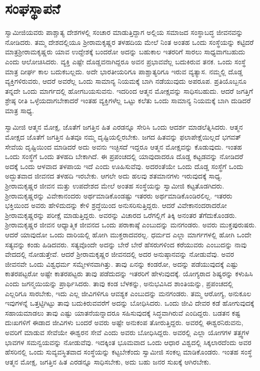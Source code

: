 
\chapter{ಸಂಘಸ್ಥಾಪನೆ}

 ಸ್ವಾಮೀಜಿಯವರು ಪಾಶ್ಚಾತ್ಯ ದೇಶಗಳಲ್ಲಿ ಸಂಚಾರ ಮಾಡುತ್ತಿದ್ದಾಗ ಅಲ್ಲಿಯ ಸಮಾಜದ ಸಂಸ್ಥಾಬದ್ಧ ಜೀವನವನ್ನು ನೋಡಿದರು. ತಮ್ಮ ದೇಶದಲ್ಲಿಯೂ ಶ‍್ರೀರಾಮಕೃಷ್ಣರ ತಳಹದಿಯ ಮೇಲೆ ನಿಂತ ಅಂತಹ ಒಂದು ಸಂಸ್ಥೆಯನ್ನು ಕಟ್ಟಿದರೆ ಮಾತ್ರ\break ಶ‍್ರೀರಾಮಕೃಷ್ಣರು ಯಾವ ಉದ್ದೇಶಕ್ಕೆ ಬಂದರೋ ಅದನ್ನು ಬಹುಕಾಲ ಇತರರಿಗೆ ಸಾರಲು ಸಾಧ್ಯವಾಗಬಹುದು ಎಂದು ಆಲೋಚಿಸಿದರು. ವ್ಯಕ್ತಿ ಎಷ್ಟೇ ದೊಡ್ಡವನಾಗಿದ್ದರೂ ಅವನ ಪ್ರಭಾವವೆಲ್ಲ ಬದುಕಿರುವ ತನಕ. ಒಂದು ಸಂಸ್ಥೆ ಮಾತ್ರ ದೀರ್ಘ ಕಾಲ ಬದುಕಬಲ್ಲದು. ಅದೇ ಭಾರತೀಯರಿಗೂ‌ ಪಾಶ್ಚಾತ್ಯರಿಗೂ ಇರುವ ವ್ಯತ್ಯಾಸ. ನಮ್ಮಲ್ಲಿ ದೊಡ್ಡ ವ್ಯಕ್ತಿಗಳಿರುವರು, ಆದರೆ ಅವರೆಲ್ಲ ಒಂದು ಸಾಮಾನ್ಯ ನಿಯಮಕ್ಕೆ ಬಾಗಿ ನಡೆಯುವುದು ಅಪರೂಪ. ಪ್ರತಿಯೊಬ್ಬನೂ ತನ್ನದೇ ಒಂದು ಮಾರ್ಗದಲ್ಲಿ ಹೋಗಬಯಸುವನು. ಇದರಿಂದ ಆತ್ಮನ ಮೋಕ್ಷವನ್ನು ಸಾಧಿಸಬಹುದು. ಆದರೆ ಜಗತ್ತಿಗೆ ಶ್ರೇಷ್ಠ ರೀತಿ ಒಳ್ಳೆಯದಾಗಬೇಕಾದರೆ ಇಂತಹ ವ್ಯಕ್ತಿಗಳೆಲ್ಲ ಒಟ್ಟು ಕಲೆತು ಒಂದು ಸಾಮಾನ್ಯ ನಿಯಮಕ್ಕೆ ಬಾಗಿ ದುಡಿದರೆ ಮಾತ್ರ ಸಾಧ್ಯ. 

 ಸ್ವಾಮೀಜಿ ಆತ್ಮನ ಮೋಕ್ಷ, ಜೊತೆಗೆ ಜಗತ್ತಿನ ಹಿತ ಎರಡನ್ನೂ ಸೇರಿಸಿ ಒಂದು ಆದರ್ಶ ಮಾಡಲೆತ್ನಿಸಿದರು. ಆತ್ಮನ ಮೋಕ್ಷದ ಜೊತೆಗೆ ಜಗತ್ತಿನ ಹಿತವೂ ನಮ್ಮ ದೃಷ್ಟಿಯಲ್ಲಿರಬೇಕು. ಜಗದ ಹಿತವನ್ನು ಫಲಾಪೇಕ್ಷೆಯಿಲ್ಲದೆ ಭಗವತ್ ಸೇವೆಯ ದೃಷ್ಟಿಯಿಂದ ಮಾಡಿದರೆ ಅದು ಅವನು ಇಚ್ಛಿಸದೆ ಇದ್ದರೂ ಆತ್ಮನ ಮೋಕ್ಷವನ್ನು ಕೊಡುವುದು. ಇಂತಹ ಒಂದು ಸಂಸ್ಥೆಗೆ ಒಂದು ತಳಹದಿ ಬೇಕಾಗಿದೆ. ಈ ಪ್ರಪಂಚದಲ್ಲಿ ಯಾವುದಾದರೂ ದೊಡ್ಡ ಕಟ್ಟಡವನ್ನು ನೋಡಿದರೆ ಅದಕ್ಕೆ ಒಂದು ಆಳವಾದ ತಳಪಾಯ ಇದೆ ಎಂದು ಊಹಿಸುವೆವು. ಅದರಂತೆಯೇ ಒಂದು ದೊಡ್ಡ ಸಂಸ್ಥೆಗೆ ಒಂದು ಅದ್ಭುತವಾದ ಜೀವನದ ತಳಹದಿ ಇರಬೇಕು. ಆಗಲೇ ಅದು ಹಲವು ಶತಮಾನಗಳು ಇರುವುದಕ್ಕೆ ಸಾಧ್ಯ. ಶ‍್ರೀರಾಮಕೃಷ್ಣರ ಜೀವನ ಮತ್ತು ಉಪದೇಶದ ಮೇಲೆ ಅಂತಹ ಸಂಸ್ಥೆಯನ್ನು ಸ್ವಾಮೀಜಿ ಕಟ್ಟತೊಡಗಿದರು. ಶ‍್ರೀರಾಮಕೃಷ್ಣರನ್ನು ವಿವೇಕಾನಂದರು ಅರ್ಥಮಾಡಿಕೊಂಡಷ್ಟು ಇತರರು ಅರ್ಥಮಾಡಿಕೊಂಡಿರಲಿಲ್ಲ. ಇತರರು ಭಕ್ತಿಯಿಂದ ಅವರು ಹೇಳಿದುದನ್ನು ಕೇಳಿ ಶ್ರದ್ಧೆಯಿಂದ ಅನುಸರಿಸುತ್ತಿದ್ದರು. ಆದರೆ ವಿವೇಕಾನಂದರಾದರೋ ಶ‍್ರೀರಾಮಕೃಷ್ಣರನ್ನು ಪರೀಕ್ಷೆ ಮಾಡುತ್ತಿದ್ದರು. ಅವರನ್ನು ವಿಚಾರದ ಒರೆಗಲ್ಲಿಗೆ ತಿಕ್ಕಿ ಅನಂತರ ತೆಗೆದುಕೊಂಡರು. ಶ‍್ರೀರಾಮಕೃಷ್ಣರ ಜೀವನ ಆಧ್ಯಾತ್ಮಿಕ ಜೀವನದ ಒಂದು ಪರಾಕಾಷ್ಠೆ ಎಂಬುದನ್ನು ಮನಗಂಡರು. ಅವರು ಮುಕ್ತಪುರುಷರು. ಆದರೆ ಯಾವುದೋ ಒಂದು ದಾರಿಯಲ್ಲಿ ಹೋಗಿ ಮುಕ್ತರಾದವರಲ್ಲ. ಧರ್ಮದ ಎಲ್ಲಾ ಮಾರ್ಗಗಳಲ್ಲಿ ಹೋಗಿ ಒಂದೇ ಸತ್ಯವನ್ನು ಕಂಡು ಹಿಡಿದವರು. ಸತ್ಯವೊಂದೇ ಅದನ್ನು ಬೇರೆ ಬೇರೆ ಹೆಸರುಗಳಿಂದ ಕರೆಯುವರು ಎಂಬುದನ್ನು ನಾವು ವೇದದಲ್ಲಿ ನೋಡುತ್ತೇವೆ. ಆದರೆ ಶ‍್ರೀರಾಮಕೃಷ್ಣರ ಜೀವನದಲ್ಲಿ ಅದರ ಅನುಷ್ಠಾನವನ್ನು ನೋಡುವೆವು. ಅವರ ಜೀವನವೇ ಒಂದು ವಿಶ್ವಧರ್ಮ ಸಮ್ಮೇಳನವಾಗಿತ್ತು. ತಾವು ಏನನ್ನು ಕಂಡರೋ, ಅದನ್ನು ಪಡೆಯುವುದಕ್ಕೆ ಎಷ್ಟು ಕಾತರಪಟ್ಟರೋ ಅಷ್ಟೇ ಕಾತರಪಟ್ಟರು ತಾವು ಪಡೆದುದನ್ನು ಇತರರಿಗೆ ಹೇಳುವುದಕ್ಕೆ. ಯೋಗ್ಯರಾದ ಶಿಷ್ಯರನ್ನು ಕಳುಹಿಸಿ ಎಂದು ಜಗನ್ಮಯಿಯನ್ನು ಪ್ರಾರ್ಥಿಸಿದರು. ತಾವು ಕಂಡ ಬೆಳಕನ್ನು, ಅನುಭವಿಸಿದ ಶಾಂತಿಯನ್ನು, ಪ್ರಪಂಚದಲ್ಲಿ ಎಲ್ಲರಿಗೂ ಸಾರಬೇಕು, ಇದು ಎಲ್ಲ ಜೀವಿಗಳಿಗೂ ಆವಶ್ಯಕ ಎಂಬುದನ್ನು ಮನಗಂಡರು. ತಮ್ಮ ಆರೋಗ್ಯ, ಅನುಕೂಲ ಇವುಗಳನ್ನೆ ಒತ್ತಟ್ಟಿಗಿಟ್ಟು ತಾವು ಬದುಕಿರುವವರೆಗೆ ಅದನ್ನು ಬೋಧಿಸಿದರು. ಒಂದು ಜೀವಿ ದೇವರ ಕಡೆ ಹೋಗುವುದಕ್ಕೆ ಸಹಾಯಮಾಡಲು ತಾವು ಎಷ್ಟು ಯಾತನೆಯನ್ನಾದರೂ ಸಹಿಸುವುದಕ್ಕೆ ಸಿದ್ಧವಾಗಿರುವೆ ಎಂದಿದ್ದರು. ಬಡತನ ಕಷ್ಟ ದುಃಖಗಳಿಗೆ ಈಡಾದ ಜೀವಿಗಳು ಬಂದರೆ ಅವರು ಅಷ್ಟೇ ಅನುಕಂಪ ತೋರುತ್ತಿದ್ದರು. ಅವರಲ್ಲಿ ಈಶ್ವರನಿರುವನು, ಅವರಿಗೆ ಮಾಡುವ ಸೇವೆಯೇ ಈಶ್ವರನ ಸೇವೆ ಎಂದು ಅವರು ಬೋಧಿಸಿದ್ದರು. ಅವರಲ್ಲಿ ಎಲ್ಲಾ ಯೋಗಗಳ ತತ್ತ್ವಗಳ ಭಾವಗಳ ಸಮನ್ವಯವನ್ನು ನೋಡುವೆವು. ಇದಕ್ಕಿಂತ ಭೂಮವಾದ ಒಂದು ಆಧಾರ ವಿಶ್ವದಲ್ಲಿ ಸಿಕ್ಕಲಾರದೆಂದು ಅವರ ಹೆಸರಿನಲ್ಲಿ ಒಂದು ಸುವ್ಯವಸ್ಥಿತವಾದ ಸಂಸ್ಥೆಯನ್ನು ಕಟ್ಟಬೇಕೆಂದು ಸ್ವಾಮೀಜಿ ಸಂಕಲ್ಪ ಮಾಡಿಕೊಂಡರು. ಇಂತಹ ಸಂಸ್ಥೆ ಆತ್ಮನ ಮೋಕ್ಷ, ಜಗತ್ತಿನ ಹಿತ ಎರಡನ್ನೂ ಸಾಧಿಸಬೇಕು, ಅದು ಬಹು ಜನರ ಸುಖಕ್ಕೆ ಆಗಿರಬೇಕು. 

